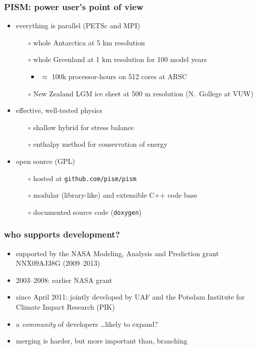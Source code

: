 \documentclass[hide notes,intlimits]{beamer}
\begin{document}
\begin{frame}
  \frametitle{PISM: power user's point of view}
  \begin{itemize}
  \item everything is parallel (PETSc and MPI)
    \begin{itemize}
    \item[$\circ$] whole Antarctica at 5 km resolution
    \item[$\circ$] whole Greenland at 1 km resolution for 100 model years
      \begin{itemize}
      \item $\approx$ 100k processor-hours on 512 cores at ARSC
      \end{itemize}
    \item[$\circ$] New Zealand LGM ice sheet at 500 m resolution (N.~Gollege at VUW)
    \end{itemize}
  \item effective, well-tested physics
    \begin{itemize}
    \item[$\circ$] shallow hybrid for stress balance
    \item[$\circ$] enthalpy method for conservation of energy
    \end{itemize}
  \item open source (GPL)
    \begin{itemize}
    \item[$\circ$] hosted at \texttt{github.com/pism/pism}
    \item[$\circ$] modular (library-like) and extensible C++ code base
    \item[$\circ$] documented source code (\texttt{doxygen})
    \end{itemize}
  \end{itemize}
\end{frame}


\begin{frame}
  \frametitle{who supports development?}
  \begin{itemize}
  \item supported by the NASA Modeling, Analysis and Prediction grant NNX09AJ38G
   (2009--2013)
  \item 2003--2008: earlier NASA grant
  \item since April 2011: jointly developed by UAF and the Potsdam
    Institute for Climate Impact Research (PIK)
  \item a \emph{community} of developers \dots likely to expand?
  \item merging is harder, but more important than, branching
  \end{itemize}
\end{frame}
\end{document}

